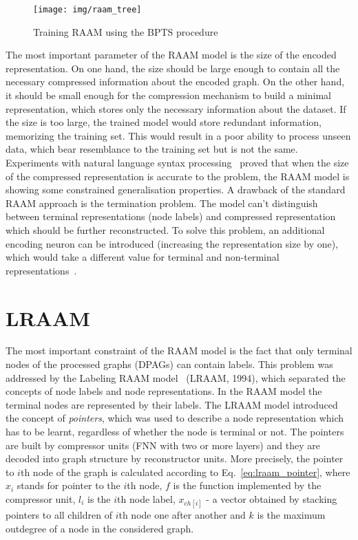 \begin{figure}
\begin{center}
	\texttt{[image: img/raam\_tree]}
	\caption{Training RAAM using the BPTS procedure}
	\label{fig:raam_tree}
\end{center}
\end{figure}

The most important parameter of the RAAM model is the size of the encoded representation. On one hand, the size should be large enough to contain all the necessary compressed information about the encoded graph. On the other hand, it should be small enough for the compression mechanism to build a minimal representation, which stores only the necessary information about the dataset. If the size is too large, the trained model would store redundant information, memorizing the training set. This would result in a poor ability to process unseen data, which bear resemblance to the training set but is not the same. Experiments with natural language syntax processing~\cite{pollack1990recursive} proved that when the size of the compressed representation is accurate to the problem, the RAAM model is showing some constrained generalisation properties. A drawback of the standard RAAM approach is the termination problem. The model can't distinguish between terminal representations (node labels) and compressed representation which should be further reconstructed. To solve this problem, an additional encoding neuron can be introduced (increasing the representation size by one), which would take a different value for terminal and non-terminal representations~\cite{stolcke1992tree}.

\section{LRAAM}
The most important constraint of the RAAM model is the fact that only terminal nodes of the processed graphs (DPAGs) can contain labels. This problem was addressed by the Labeling RAAM model~\cite{sperduti1994labelling} (LRAAM, 1994), which separated the concepts of node labels and node representations. In the RAAM model the terminal nodes are represented by their labels. The LRAAM model introduced the concept of \emph{pointers}, which was used to describe a node representation which has to be learnt, regardless of whether the node is terminal or not. The pointers are built by compressor units (FNN with two or more layers) and they are decoded into graph structure by reconstructor units. More precisely, the pointer to $i$th node of the graph is calculated according to Eq.~\ref{eq:lraam_pointer}, where $x_i$ stands for pointer to the $i$th node, $f$ is the function implemented by the compressor unit, $l_i$ is the $i$th node label, $x_{ch[i]}$ - a vector obtained by stacking pointers to all children of $i$th node one after another and $k$ is the maximum outdegree of a node in the considered graph.


